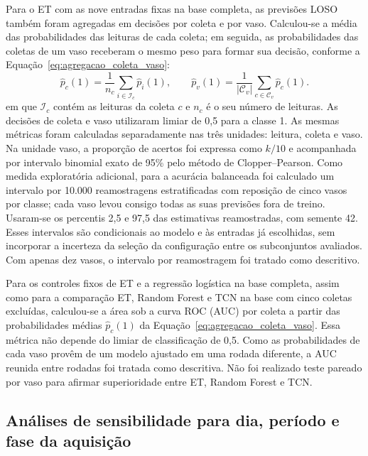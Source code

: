 Para o ET com as nove entradas fixas na base completa, as previsões LOSO também
foram agregadas em decisões por coleta e por vaso. Calculou-se a média
das probabilidades das leituras de cada coleta; em seguida, as probabilidades
das coletas de um vaso receberam o mesmo peso para formar sua decisão,
conforme a Equação~\eqref{eq:agregacao_coleta_vaso}:
\begin{equation}
    \widehat p_c(1)=\frac{1}{n_c}\sum_{i\in\mathcal I_c}\widehat p_i(1),
    \qquad
    \widehat p_v(1)=\frac{1}{|\mathcal C_v|}
    \sum_{c\in\mathcal C_v}\widehat p_c(1).
    \label{eq:agregacao_coleta_vaso}
\end{equation}
em que $\mathcal I_c$ contém as leituras da coleta $c$ e $n_c$ é o seu
número de leituras. As decisões de coleta e vaso utilizaram limiar de
0,5 para a classe 1.
As mesmas métricas foram calculadas separadamente nas três unidades:
leitura, coleta e vaso. Na unidade vaso, a proporção de acertos foi
expressa como $k/10$ e acompanhada por intervalo binomial exato de
95\% pelo método de Clopper--Pearson. Como medida exploratória adicional,
para a acurácia balanceada foi calculado um intervalo por 10.000
reamostragens estratificadas com reposição de
cinco vasos por classe; cada vaso levou consigo todas as suas previsões
fora de treino. Usaram-se os percentis 2,5 e 97,5 das estimativas
reamostradas, com semente 42. Esses intervalos são condicionais ao modelo
e às entradas já escolhidas, sem incorporar a incerteza da seleção da
configuração entre os subconjuntos avaliados. Com apenas dez vasos, o
intervalo por reamostragem foi tratado como descritivo.

Para os controles fixos de ET e a regressão logística na base completa,
assim como para a comparação ET, Random Forest e TCN na base com cinco
coletas excluídas, calculou-se a área sob a curva ROC (AUC) por coleta a
partir das probabilidades médias $\widehat p_c(1)$ da
Equação~\eqref{eq:agregacao_coleta_vaso}. Essa métrica não depende do
limiar de classificação de 0,5. Como as probabilidades de cada vaso
provêm de um modelo ajustado em uma rodada diferente, a AUC reunida
entre rodadas foi tratada como descritiva. Não foi realizado teste pareado
por vaso para afirmar superioridade entre ET, Random Forest e TCN.

\subsection{Análises de sensibilidade para dia, período e fase da aquisição}
\label{subsec:sensibilidade_dia_periodo}

